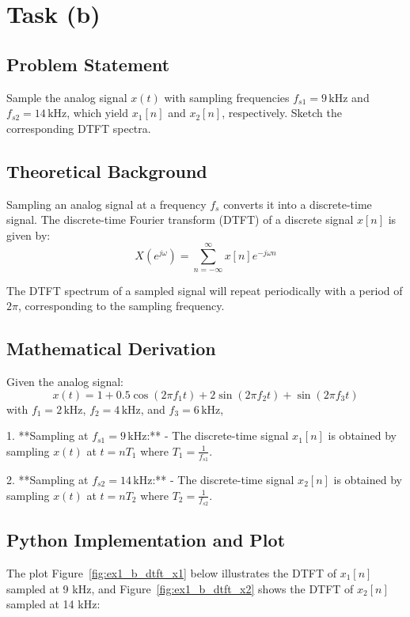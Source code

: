 \item[(b)]
\section*{Task (b)}

\subsection*{Problem Statement}
Sample the analog signal \( x(t) \) with sampling frequencies \( f_{s1} = 9 \, \text{kHz} \) and \( f_{s2} = 14 \, \text{kHz} \), which yield \( x_1[n] \) and \( x_2[n] \), respectively. Sketch the corresponding DTFT spectra.

\subsection*{Theoretical Background}
Sampling an analog signal at a frequency \( f_s \) converts it into a discrete-time signal. The discrete-time Fourier transform (DTFT) of a discrete signal \( x[n] \) is given by:
\[ X(e^{j\omega}) = \sum_{n=-\infty}^{\infty} x[n] e^{-j\omega n} \]

The DTFT spectrum of a sampled signal will repeat periodically with a period of \( 2\pi \), corresponding to the sampling frequency.

\subsection*{Mathematical Derivation}
Given the analog signal:
\[ x(t) = 1 + 0.5 \cos \left(2 \pi f_{1} t \right) + 2 \sin \left(2 \pi f_{2} t \right) + \sin \left(2 \pi f_{3} t \right) \]
with \( f_{1} = 2 \, \text{kHz} \), \( f_{2} = 4 \, \text{kHz} \), and \( f_{3} = 6 \, \text{kHz} \),

1. **Sampling at \( f_{s1} = 9 \, \text{kHz} \):**
   - The discrete-time signal \( x_1[n] \) is obtained by sampling \( x(t) \) at \( t = nT_1 \) where \( T_1 = \frac{1}{f_{s1}} \).

2. **Sampling at \( f_{s2} = 14 \, \text{kHz} \):**
   - The discrete-time signal \( x_2[n] \) is obtained by sampling \( x(t) \) at \( t = nT_2 \) where \( T_2 = \frac{1}{f_{s2}} \).

\subsection*{Python Implementation and Plot}
The plot Figure~\ref{fig:ex1_b_dtft_x1} below illustrates the DTFT of \( x_1[n] \) sampled at 9 kHz, and Figure~\ref{fig:ex1_b_dtft_x2} shows the DTFT of \( x_2[n] \) sampled at 14 kHz:


